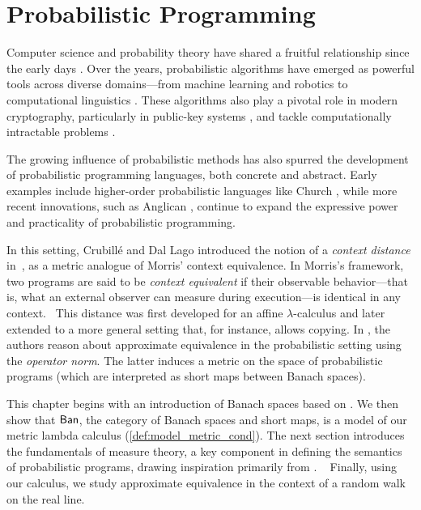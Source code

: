 \chapter{Probabilistic Programming} \label{ch:pp}


Computer science and probability theory have shared a fruitful relationship since the early days \cite{de1956computability}. Over the years, probabilistic algorithms have emerged as powerful tools across diverse domains—from machine learning \cite{pearl2014} and robotics \cite{thrun2002robotic} to computational linguistics \cite{manning1999foundations}. These algorithms also play a pivotal role in modern cryptography, particularly in public-key systems \cite{goldwasserProbabilisticEncryption1984}, and tackle computationally intractable problems \cite{motwaniRandomizedAlgorithms1995}.

The growing influence of probabilistic methods has also spurred the development of probabilistic programming languages, both concrete and abstract. Early examples include higher-order probabilistic languages like Church \cite{Church2008}, while more recent innovations, such as Anglican \cite{Anglican2015}, continue to expand the expressive power and practicality of probabilistic programming.


In this setting, Crubillé and Dal Lago introduced the notion of a \emph{context distance} in~\cite{crubilleMetricReasoningLterms2015,crubilleMetricReasoninglambda2017}, as a metric analogue of Morris' context equivalence. In Morris's framework, two programs are said to be \emph{context equivalent} if their observable behavior---that is, 
what an external observer can measure during execution---is identical in any context.  This distance was first developed for an affine $\lambda$-calculus and later extended to a more general 
setting that, for instance, allows copying.
%
In \cite{dahlqvist2023syntactic}, the authors reason about approximate equivalence in the probabilistic setting using the \emph{operator norm}. The latter induces a metric on the space of probabilistic programs (which are interpreted as short maps between Banach spaces).

This chapter begins with an introduction of Banach spaces based on \cite{rudin91functional,guide2006infinite, ryanIntroductionTensorProducts2013}. We then show that $\mathsf{Ban}$, the category of Banach spaces and short maps, is a model of our metric lambda calculus (\autoref{def:model_metric_cond}). The next section introduces the fundamentals of measure theory, a key component in defining the semantics of probabilistic programs, drawing inspiration primarily from \cite{dahlqvistSemanticsProbabilisticProgramming2020a, bogachevMeasureTheory2007,guide2006infinite}.  
Finally, using our calculus, we study approximate equivalence in the context of a random walk on the real line.



